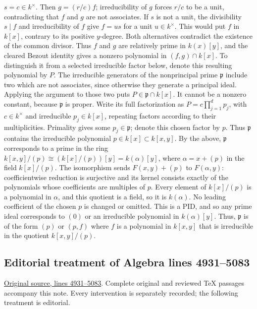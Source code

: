 \begin{example}
$s=c\in k^\times$. Then $g=(r/c)f$; irreducibility of $g$
forces $r/c$ to be a unit, contradicting that $f$ and $g$ are
not associates. If $s$ is not a unit, the divisibility $s\mid f$
and irreducibility of $f$ give $f=us$ for a unit $u\in k^\times$.
This would put $f$ in $k[x]$, contrary to its positive $y$-degree.
Both alternatives contradict the existence of the common divisor.
Thus $f$ and $g$ are relatively prime in $k(x)[y]$, and the
cleared Bezout identity gives a nonzero polynomial in $(f,g)\cap k[x]$.
To distinguish it from a selected irreducible factor below, denote
this resulting polynomial by $P$.
The irreducible generators of the nonprincipal prime $\mathfrak p$
include two which are not associates, since otherwise they generate
a principal ideal. Applying the argument to those two puts
$P\in\mathfrak p\cap k[x]$. It cannot be a nonzero constant,
because $\mathfrak p$ is proper. Write its full factorization as
$P=c\prod_{j=1}^d p_j$, with $c\in k^\times$ and irreducible
$p_j\in k[x]$, repeating factors according to their multiplicities.
Primality gives some $p_j\in\mathfrak p$; denote this chosen
factor by $p$. Thus $\mathfrak p$ contains the irreducible
polynomial $p\in k[x]\subset k[x,y]$.
By the above, $\mathfrak p$ corresponds to a prime in the ring
$k[x,y]/(p)\cong(k[x]/(p))[y]=k(\alpha)[y]$, where
$\alpha=x+(p)$ in the field $k[x]/(p)$.
The isomorphism sends $F(x,y)+(p)$ to $F(\alpha,y)$:
coefficientwise reduction is surjective and its kernel consists
exactly of the polynomials whose coefficients are multiples of $p$.
Every element of $k[x]/(p)$ is a polynomial in $\alpha$, and this
quotient is a field, so it is $k(\alpha)$. No leading coefficient
of the chosen $p$ is changed or omitted. This is a
PID, and so any prime ideal corresponds to $(0)$ or an
irreducible polynomial in $k(\alpha)[y]$. Thus, $\mathfrak p$
is of the form $(p)$ or $(p, f)$ where $f$ is a
polynomial in $k[x, y]$ that is irreducible in the quotient
$k[x, y]/(p)$.
\end{example}


\subsection{Editorial treatment of Algebra lines 4931--5083}

\hypertarget{algebra-context-027}{}

\noindent\href{https://github.com/stacks/stacks-project/blob/a04446e57ec1fbc252a871afcec7752fb2807b14/algebra.tex\#L4931}{Original source, lines 4931--5083}. Complete original and reviewed TeX passages accompany this note. Every intervention is separately recorded; the following treatment is editorial.


